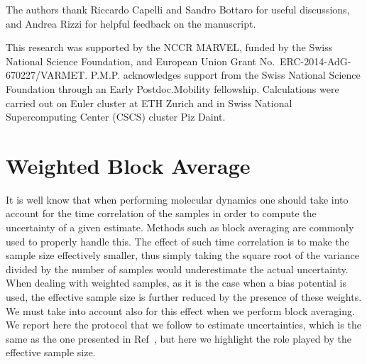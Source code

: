 \documentclass[aps,prx,reprint,superscriptaddress]{revtex4-1} %
\begin{document}
\begin{acknowledgments}
The authors thank Riccardo Capelli and Sandro Bottaro for useful discussions, and Andrea Rizzi for helpful feedback on the manuscript.

This research was supported by the NCCR MARVEL, funded by the Swiss National Science Foundation, and European Union Grant No.~ERC-2014-AdG-670227/VARMET.
P.M.P. acknowledges support from the Swiss National Science Foundation through an Early Postdoc.Mobility fellowship.
Calculations were carried out on Euler cluster at ETH Zurich and in Swiss National Supercomputing Center (CSCS) cluster Piz Daint.

\end{acknowledgments}

\appendix

\section{Weighted Block Average\label{A:block}}
It is well know that when performing molecular dynamics one should take into account for the time correlation of the samples in order to compute the uncertainty of a given estimate.
Methods such as block averaging\cite{Flyvbjerg1989} are commonly used to properly handle this.
The effect of such time correlation is to make the sample size effectively smaller, thus simply taking the square root of the variance divided by the number of samples would underestimate the actual uncertainty.
When dealing with weighted samples, as it is the case when a bias potential is used, the effective sample size is further reduced by the presence of these weights.
We must take into account also for this effect when we perform block averaging.
We report here the protocol that we follow to estimate uncertainties, which is the same as the one presented in Ref~, but here we highlight the role played by the effective sample size.
\end{document}
